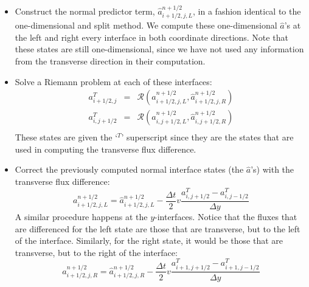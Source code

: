 \begin{itemize}
\item Construct the normal predictor term, $\hat{a}_{i+1/2,j,L}^{n+1/2}$,
in a fashion identical to the one-dimensional and split method.  We
compute these one-dimensional $\hat{a}$'s at the left and right every
interface in both coordinate directions.  Note that these states are
still one-dimensional, since we have not used any information from the
transverse direction in their computation.  

\item Solve a Riemann problem at each of these interfaces:
\begin{eqnarray}
a^T_{i+1/2,j} &=& \mathcal{R}(\hat{a}_{i+1/2,j,L}^{n+1/2},
                              \hat{a}_{i+1/2,j,R}^{n+1/2}) \\
a^T_{i,j+1/2} &=& \mathcal{R}(\hat{a}_{i,j+1/2,L}^{n+1/2},
                              \hat{a}_{i,j+1/2,R}^{n+1/2}) \\
\end{eqnarray}
These states are given the `$^T$' superscript since they are the states
that are used in computing the transverse flux difference.  

\item Correct the 
previously computed normal interface states (the $\hat{a}$'s) with
the transverse flux difference:
\begin{equation}
a_{i+1/2,j,L}^{n+1/2} = \hat{a}_{i+1/2,j,L}^{n+1/2} 
   - \frac{\Delta t}{2} v \frac{a^T_{i,j+1/2} - a^T_{i,j-1/2}}{\Delta y}
\end{equation}
A similar procedure happens at the $y$-interfaces.  Notice that the
fluxes that are differenced for the left state are those that are
transverse, but to the left of the interface.  Similarly, for the
right state, it would be those that are transverse, but to the right
of the interface:
\begin{equation}
a_{i+1/2,j,R}^{n+1/2} = \hat{a}_{i+1/2,j,R}^{n+1/2} 
   - \frac{\Delta t}{2} v \frac{a^T_{i+1,j+1/2} - a^T_{i+1,j-1/2}}{\Delta y}
\end{equation}
\end{itemize}

